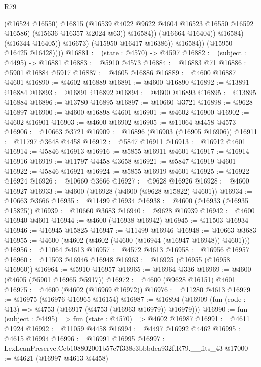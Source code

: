 \begin{lexlean}{R79}
\begin{coremodule}
                              (@16524 @16550)
                              @16815
                              (@16539 @4022 @9622 @4604 @16523 @16550 @16592 @16586)
                              (@15636 @16357 @2024 @63))
                            @16584))
                        (@16664 @16404))
                      @16584)
                    (@16344 @16405))
                  @16673)
                (@15950 @16417 @16386))
              @16584))
          (@15950 @16425 @16428))))
@16881 := (state : @4570) -> @4597
@16882 := (subject : @4495) -> @16881
@16883 := @5910 @4573
@16884 := @16883 @71
@16886 := @5901 @16884 @5917
@16887 := @4605 @16886
@16889 := @4600 @16887 @4601
@16890 := @4602 @16889
@16891 := @4600 @16890
@16892 := @13891 @16884
@16893 := @16891 @16892
@16894 := @4600 @16893
@16895 := @13895 @16884
@16896 := @13780 @16895
@16897 := @10660 @3721
@16898 := @9628 @16897
@16900 := @4600 @16898 @4601
@16901 := @4602 @16900
@16902 := @4602 @16901
@16903 := @4600 @16902
@16905 := @11064 @4458 @4573
@16906 := @10663 @3721
@16909 := @16896 (@16903 (@16905 @16906))
@16911 := @11797 @3648 @4458
@16912 := @5847 @16911
@16913 := @16912 @4601
@16914 := @5846 @16913
@16916 := @5855 @16911 @4601
@16917 := @16914 @16916
@16919 := @11797 @4458 @3658
@16921 := @5847 @16919 @4601
@16922 := @5846 @16921
@16924 := @5855 @16919 @4601
@16925 := @16922 @16924
@16926 := @10660 @3666
@16927 := @9628 @16926
@16928 := @4600 @16927
@16933 := @4600 (@16928 (@4600 (@9628 @15822) @4601))
@16934 := @10663 @3666
@16935 := @11499 @16934
@16938 := @4600 (@16933 (@16935 @15825))
@16939 := @10660 @3683
@16940 := @9628 @16939
@16942 := @4600 @16940 @4601
@16944 := @4600 (@16938 @16942)
@16945 := @11503 @16934
@16946 := @16945 @15825
@16947 := @11499 @16946
@16948 := @10663 @3683
@16955 := @4600 (@4602 (@4602 (@4600 (@16944 (@16947 @16948)) @4601)))
@16956 := @11064 @4613
@16957 := @4572 @4613
@16958 := @16956 @16957
@16960 := @11503 @16946 @16948
@16963 := @16925 (@16955 (@16958 @16960))
@16964 := @5910 @16957
@16965 := @16964 @336
@16969 := @4600 (@4605 (@5901 @16965 @5917))
@16972 := @4600 (@9628 @16151) @4601
@16975 := @4600 (@4602 (@16969 @16972))
@16976 := @11280 @4613
@16979 := @16975 (@16976 @16965 @16154)
@16987 := @16894 (@16909 (fun (code : @13) => @4753 (@16917 (@4753 (@16963 @16979)) @16979)))
@16990 := fun (subject : @4495) => fun (state : @4570) => @4602 @16987
@16991 := @4611 @1924
@16992 := @11059 @4458
@16994 := @4497 @16992 @4462
@16995 := @4615 @16994
@16996 := @16991 @16995
@16997 := LexLeanPreserve.Ceb108802001b57e7f338e3bbbdea932f.R79.__fits_43
@17000 := @4621 (@16997 @4613 @4458)

\end{coremodule}
\end{lexlean}
